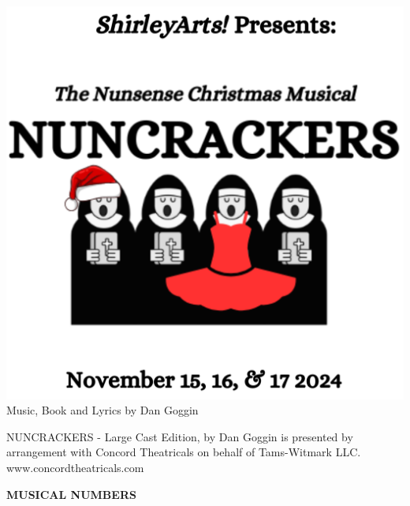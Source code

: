 \documentclass[12pt, a5paper, oneside]{article}
\begin{document}
\newcommand\song[2]{\item\raggedright\textbf{#1}\dotfill \raggedleft\emph{#2}\par}
\newcommand\cast[2]{{#2}\dotfill \emph{#1}\newline}
\newcommand\crew[2]{\raggedright\textbf{#1}\dotfill \raggedleft\emph{#2}\par}
\newcommand\choir[1]{\centering\emph{#1}\par}
\pagestyle{empty} %
\setlength\parindent{0em} %

\begin{center}

\includegraphics[scale=0.6]{media/program_cover.png}
\\
\Large Music, Book and Lyrics by 
Dan Goggin \par
\hfill\newline
\normalsize
NUNCRACKERS - Large Cast Edition, by Dan Goggin is presented by arrangement with Concord Theatricals on behalf of Tams-Witmark LLC. \\
www.concordtheatricals.com


\end{center}

\pagebreak
\begin{center}
\Large \textbf{MUSICAL NUMBERS}
\end{center}
\end{document}
